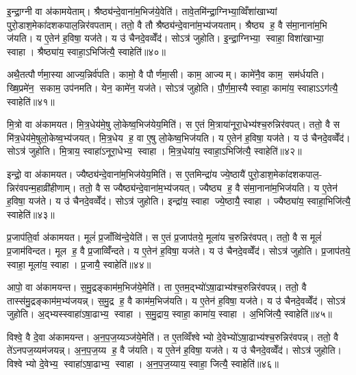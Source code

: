 इ॒न्द्रा॒ग्नी वा अ॑कामयेताम्। श्रैष्ठ्य॑न्दे॒वाना॑म॒भिज॑ये॒वेति॑। तावे॒तमि॑न्द्रा॒ग्निभ्या॒व्विँशा॑खाभ्यां पुरो॒डाश॒मेका॑दशकपाल॒न्निर॑वपताम्। ततो॒ वै तौ श्रैष्ठ्य॑न्दे॒वाना॑म॒भ्य॑जयताम्। श्रैष्ठ्य ह॒ वै स॑मा॒नाना॑म॒भि ज॑यति। य ए॒तेन॑ ह॒विषा॒ यज॑ते। य उ॑ चैनदे॒वव्वेँद॑। सोऽत्र॑ जुहोति। इ॒न्द्रा॒ग्निभ्या॒ स्वाहा॒ विशा॑खाभ्या॒ स्वाहा। श्रैष्ठ्या॑य॒ स्वाहा॒ऽभिजि॑त्यै॒ स्वाहेति॑॥४०॥

अथै॒तत्पौर्णमा॒स्या आज्य॒न्निर्व॑पति। कामो॒ वै पौर्णमा॒सी। काम॒ आज्यम्। कामे॑नै॒व काम॒ सम॑र्धयति। ख्षि॒प्रमे॑न॒ सकाम॒ उप॑नमति। येन॒ कामे॑न॒ यज॑ते। सोऽत्र॑ जुहोति। पौ॒र्ण॒मा॒स्यै स्वाहा॒ कामा॑य॒ स्वाहाऽऽग॑त्यै॒ स्वाहेति॑॥४१॥\anuvakamend[अ॒ग्निः पञ्च॑दश प्र॒जाप॑ति॒ष्षोड॑श॒ सोम॒ एका॑दश रु॒द्रो दश॒र्ख्षैका॑दश॒ बृह॒स्पति॒र्दश॑ देवासु॒रा नव॑ पि॒तर॒ एका॑दशार्य॒मा भगो॒ दश॑ दश सवि॒ता चतु॑र्दश॒ त्वष्टा॑ वा॒युरि॑न्द्रा॒ग्नी दश॑ द॒शाथै॒तत्पौर्णमा॒स्या अ॒ष्टौ पञ्च॑दश]

मि॒त्रो वा अ॑कामयत। मि॒त्र॒धेय॑मे॒षु लो॒केष्व॒भिज॑येय॒मिति॑। स ए॒तं मि॒त्राया॑नूरा॒धेभ्य॑श्च॒रुन्निर॑वपत्। ततो॒ वै स मि॑त्र॒धेय॑मे॒षुलो॒केष्व॒भ्य॑जयत्। मि॒त्र॒धेय ह॒ वा ए॒षु लो॒केष्व॒भिज॑यति। य ए॒तेन॑ ह॒विषा॒ यज॑ते। य उ॑ चैनदे॒वव्वेँद॑। सोऽत्र॑ जुहोति। मि॒त्राय॒ स्वाहा॑ऽनूरा॒धेभ्य॒ स्वाहा। मि॒त्र॒धेया॑य॒ स्वाहा॒ऽभिजि॑त्यै॒ स्वाहेति॑॥४२॥

इन्द्रो॒ वा अ॑कामयत। ज्यैष्ठ्य॑न्दे॒वाना॑म॒भिज॑येय॒मिति॑। स ए॒तमिन्द्रा॑य ज्ये॒ष्ठायै॑ पुरो॒डाश॒मेका॑दशकपाल॒- न्निर॑वपन्म॒हाव्री॑हीणाम्। ततो॒ वै स ज्यैष्ठ्य॑न्दे॒वाना॑म॒भ्य॑जयत्। ज्यैष्ठ्य ह॒ वै स॑मा॒नाना॑म॒भिज॑यति। य ए॒तेन॑ ह॒विषा॒ यज॑ते। य उ॑ चैनदे॒वव्वेँद॑। सोऽत्र॑ जुहोति। इन्द्रा॑य॒ स्वाहा ज्ये॒ष्ठायै॒ स्वाहा। ज्यैष्ठ्या॑य॒ स्वाहा॒भिजि॑त्यै॒ स्वाहेति॑॥४३॥

प्र॒जाप॑ति॒र्वा अ॑कामयत। मूलं॑ प्र॒जाँव्वि॑न्दे॒येति॑। स ए॒तं प्र॒जाप॑तये॒ मूला॑य च॒रुन्निर॑वपत्। ततो॒ वै स मूलं॑ प्र॒जाम॑विन्दत। मूल ह॒ वै प्र॒जाव्विँ॑न्दते। य ए॒तेन॑ ह॒विषा॒ यज॑ते। य उ॑ चैनदे॒वव्वेँद॑। सोऽत्र॑ जुहोति। प्र॒जाप॑तये॒ स्वाहा॒ मूला॑य॒ स्वाहा। प्र॒जायै॒ स्वाहेति॑॥४४॥

आपो॒ वा अ॑कामयन्त। स॒मु॒द्रङ्काम॑म॒भिज॑ये॒मेति॑। ता ए॒तम॒द्भ्यो॑ऽषा॒ढाभ्य॑श्च॒रुन्निर॑वपन्न्। ततो॒ वै तास्स॑मु॒द्रङ्काम॑म॒भ्य॑जयन्न्। स॒मु॒द्र ह॒ वै काम॑म॒भिज॑यति। य ए॒तेन॑ ह॒विषा॒ यज॑ते। य उ॑ चैनदे॒वव्वेँद॑। सोऽत्र॑ जुहोति। अ॒द्भ्यस्स्वाहा॑ऽषा॒ढाभ्य॒ स्वाहा। स॒मु॒द्राय॒ स्वाहा॒ कामा॑य॒ स्वाहा। अ॒भिजि॑त्यै॒ स्वाहेति॑॥४५॥

विश्वे॒ वै दे॒वा अ॑कामयन्त। अ॒न॒प॒ज॒य्यञ्ज॑ये॒मेति॑। त ए॒तव्विँश्वेभ्यो दे॒वेभ्यो॑ऽषा॒ढाभ्य॑श्च॒रुन्निर॑वपन्न्। ततो॒ वै ते॑ऽनपज॒य्यम॑जयन्न्। अ॒न॒प॒ज॒य्य ह॒ वै ज॑यति। य ए॒तेन॑ ह॒विषा॒ यज॑ते। य उ॑ चैनदे॒वव्वेँद॑। सोऽत्र॑ जुहोति। विश्वेभ्यो दे॒वेभ्य॒ स्वाहा॑ऽषा॒ढाभ्य॒ स्वाहा। अ॒न॒प॒ज॒य्याय॒ स्वाहा॒ जित्यै॒ स्वाहेति॑॥४६॥


